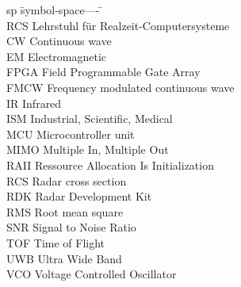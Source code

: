 \begin{listofabbrevs}
\begin{tabbing}

sp	\= symbol-space---- \= \kill \+ \\

RCS	\> Lehrstuhl für Realzeit-Computersysteme \\
CW \> Continuous wave \\
EM \> Electromagnetic \\
FPGA \> Field Programmable Gate Array \\
FMCW \> Frequency modulated continuous wave \\
IR \> Infrared \\
ISM \> Industrial, Scientific, Medical \\
MCU \> Microcontroller unit \\
MIMO \> Multiple In, Multiple Out \\
RAII \> Ressource Allocation Is Initialization \\
RCS \> Radar cross section \\
RDK \> Radar Development Kit \\
RMS \> Root mean square \\
SNR \> Signal to Noise Ratio \\
TOF \> Time of Flight \\
UWB \> Ultra Wide Band \\
VCO \> Voltage Controlled Oscillator \\

\end{tabbing}
\end{listofabbrevs}